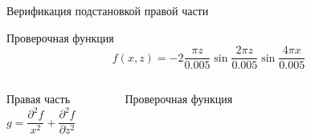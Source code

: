 \documentclass[ignoreonframetext,unicode]{beamer}
\begin{document}
\begin{frame}{Верификация подстановкой правой части}
	
	\begin{block}{Проверочная функция}
	\begin{equation*}
		f(x, z) = -2 \frac{\pi z}{0.005} \sin{\frac{2 \pi z}{0.005}} \sin{\frac{4 \pi x}{0.005}}
		\label{check_func_2}
	\end{equation*}
\end{block}

\begin{columns}

\begin{block}{Правая часть}
\begin{equation*}
	g = \frac{\partial^2 f}{x^2} + \frac{\partial^2 f}{\partial z^2}
\end{equation*} 
\end{block}

\begin{figure}[!htbp]
	\caption{Проверочная функция}
	\label{check_func_1_pic}
\end{figure}


\end{columns}
\end{frame}
\end{document}
